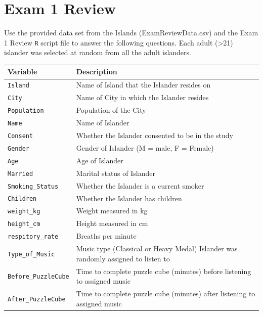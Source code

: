 \documentclass[
]{report}
\begin{document}
\newpage

\hypertarget{exam-1-review}{%
\chapter{Exam 1 Review}\label{exam-1-review}}

Use the provided data set from the Islands (ExamReviewData.csv) and the Exam 1 Review \texttt{R} script file to answer the following questions. Each adult (\textgreater21) islander was selected at random from all the adult islanders.

\begin{longtable}[]{@{}
  >{\raggedright\arraybackslash}p{}
  >{\raggedright\arraybackslash}p{}@{}}
\toprule
\textbf{Variable} & \textbf{Description} \\
\midrule
\endhead
\texttt{Island} & Name of Island that the Islander resides on \\
\texttt{City} & Name of City in which the Islander resides \\
\texttt{Population} & Population of the City \\
\texttt{Name} & Name of Islander \\
\texttt{Consent} & Whether the Islander consented to be in the study \\
\texttt{Gender} & Gender of Islander (M = male, F = Female) \\
\texttt{Age} & Age of Islander \\
\texttt{Married} & Marital status of Islander \\
\texttt{Smoking\_Status} & Whether the Islander is a current smoker \\
\texttt{Children} & Whether the Islander has children \\
\texttt{weight\_kg} & Weight measured in kg \\
\texttt{height\_cm} & Height measured in cm \\
\texttt{respitory\_rate} & Breaths per minute \\
\texttt{Type\_of\_Music} & Music type (Classical or Heavy Medal) Islander was randomly assigned to listen to \\
\texttt{Before\_PuzzleCube} & Time to complete puzzle cube (minutes) before listening to assigned music \\
\texttt{After\_PuzzleCube} & Time to complete puzzle cube (minutes) after listening to assigned music \\

\end{longtable}
\end{document}

